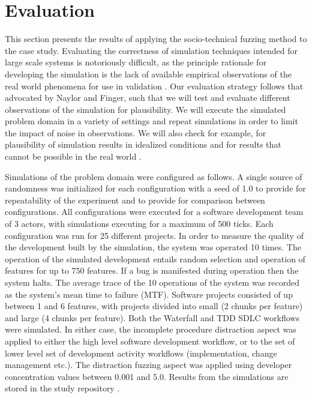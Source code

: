 \documentclass{llncs}
\begin{document}

\section{Evaluation}
\label{sec:evaluation}


This section presents the results of applying the socio-technical fuzzing method to the case study.  Evaluating the
correctness of simulation techniques intended for large scale systems is notoriously difficult, as the principle
rationale for developing the simulation is the lack of available empirical observations of the real world phenomena for
use in validation \citet{naylor67verification}.  Our evaluation strategy follows that advocated by Naylor and Finger,
such that we will test and evaluate different observations of the simulation for plausibility.  We will execute the
simulated problem domain in a variety of settings and repeat simulations in order to limit the impact of noise in
observations.  We will also check for example, for plausibility of simulation results in idealized conditions
\cite{shull11assuring} and for results that cannot be possible in the real world \cite{weyuker82testing}.

Simulations of the problem domain were configured as follows.  A single source of randomness was initialized for each
configuration with a seed of 1.0 to provide for repeatability of the experiment and to provide for comparison between
configurations. All configurations were executed for a software development team of 3 actors, with simulations executing
for a maximum of 500 ticks.  Each configuration was run for 25 different projects.  In order to measure the quality of
the development built by the simulation, the system was operated 10 times.  The operation of the simulated development
entails random selection and operation of features for up to 750 features.  If a bug is manifested during operation then
the system halts.  The average trace of the 10 operations of the system was recorded as the system's mean time to
failure (MTF). Software projects consisted of up between 1 and 6 features, with projects divided into small (2 chunks
per feature) and large (4 chunks per feature). Both the Waterfall and TDD SDLC workflows were simulated.  In either
case, the incomplete procedure distraction aspect was applied to either the high level software development workflow, or
to the set of lower level set of development activity workflows (implementation, change management etc.).  The
distraction fuzzing aspect was applied using developer concentration values between 0.001 and 5.0.  Results from the
simulations are stored in the study repository \citep{storer2016softdev-workflow-scm}.
\end{document}
